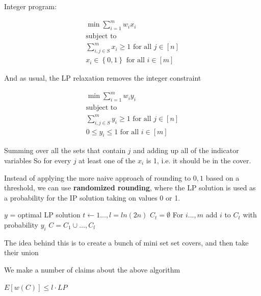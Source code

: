 \documentclass[../notes.tex]{subfiles}
\begin{document}
Integer program:

\begin{equation}
    \begin{split}
        \min \sum_{i=1}^m w_i x_i \\
        \text{subject to} \\
        \sum_{i, j \in S}^m x_i \ge 1 \text{ for all } j \in [n] \\
        x_i \in \left\{ 0, 1 \right\} \text{ for all } i \in [m]
    \end{split}
\end{equation}

And as usual, the LP relaxation removes the integer constraint

\begin{equation}
    \begin{split}
        \min \sum_{i=1}^m w_i y_i \\
        \text{subject to} \\
        \sum_{i, j \in S}^m y_i \ge 1 \text{ for all } j \in [n] \\
        0 \le y_i \le  1 \text{ for all } i \in [m]
    \end{split}
\end{equation}

Summing over all the sets that contain $ j $ and adding up all of the indicator variables
So for every $ j $ at least one of the $ x_i $ is 1, i.e. it should be in the cover.

Instead of applying the more naive approach of rounding to $ 0, 1 $ based on a threshold, we can use \textbf{randomized rounding}, where the LP solution is used as a probability for the IP solution taking on values 0 or 1.

\begin{codebox}
\li$ y $ = optimal LP solution
\li\For $  t \gets 1 \ldots, l = ln(2n) $ \Do 
\li    $ C_t = \emptyset $
\li    For $ i \ldots,  m $ add $ i $ to $ C_t $ with probability $ y_i $ \End
\li$ C = C_1 \cup \ldots, C_l $
\end{codebox}

The idea behind this is to create a bunch of mini set set covers, and then take their union

We make a number of claims about the above algorithm

\begin{lemma}
$ E[w(C)] \le  l \cdot  LP $
\end{lemma}
\end{document}
